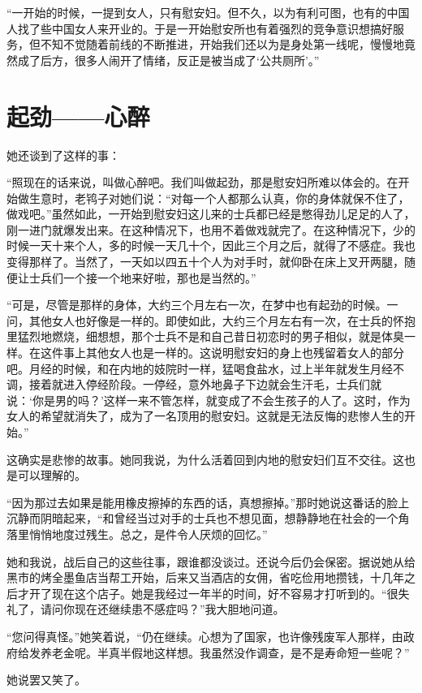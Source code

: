 \documentclass[12pt,UTF8]{ctexbook}
\begin{document}
“一开始的时候，一提到女人，只有慰安妇。但不久，以为有利可图，也有的中国人找了些中国女人来开业的。于是一开始慰安所也有着强烈的竞争意识想搞好服务，但不知不觉随着前线的不断推进，开始我们还以为是身处第一线呢，慢慢地竟然成了后方，很多人闹开了情绪，反正是被当成了‘公共厕所’。”

\section{起劲——心醉}

她还谈到了这样的事：

“照现在的话来说，叫做心醉吧。我们叫做起劲，那是慰安妇所难以体会的。在开始做生意时，老鸨子对她们说：“对每一个人都那么认真，你的身体就保不住了，做戏吧。”虽然如此，一开始到慰安妇这儿来的士兵都已经是憋得劲儿足足的人了，刚一进门就爆发出来。在这种情况下，也用不着做戏就完了。在这种情况下，少的时候一天十来个人，多的时候一天几十个，因此三个月之后，就得了不感症。我也变得那样了。当然了，一天如以四五十个人为对手时，就仰卧在床上叉开两腿，随便让士兵们一个接一个地来好啦，那也是当然的。”

“可是，尽管是那样的身体，大约三个月左右一次，在梦中也有起劲的时候。一问，其他女人也好像是一样的。即使如此，大约三个月左右有一次，在士兵的怀抱里猛烈地燃烧，细想想，那个士兵不是和自己昔日初恋时的男子相似，就是体臭一样。在这件事上其他女人也是一样的。这说明慰安妇的身上也残留着女人的部分吧。月经的时候，和在内地的妓院时一样，猛喝食盐水，过上半年就发生月经不调，接着就进入停经阶段。一停经，意外地鼻子下边就会生汗毛，士兵们就说：‘你是男的吗？’这样一来不管怎样，就变成了不会生孩子的人了。这时，作为女人的希望就消失了，成为了一名顶用的慰安妇。这就是无法反悔的悲惨人生的开始。”

这确实是悲惨的故事。她同我说，为什么活着回到内地的慰安妇们互不交往。这也是可以理解的。

“因为那过去如果是能用橡皮擦掉的东西的话，真想擦掉。”那时她说这番话的脸上沉静而阴暗起来，“和曾经当过对手的士兵也不想见面，想静静地在社会的一个角落里悄悄地度过残生。总之，是件令人厌烦的回忆。”

她和我说，战后自己的这些往事，跟谁都没谈过。还说今后仍会保密。据说她从给黑市的烤全墨鱼店当帮工开始，后来又当酒店的女佣，省吃俭用地攒钱，十几年之后才开了现在这个店子。她是我经过一年半的时间，好不容易才打听到的。“很失礼了，请问你现在还继续患不感症吗？”我大胆地问道。

“您问得真怪。”她笑着说，“仍在继续。心想为了国家，也许像残废军人那样，由政府给发养老金呢。半真半假地这样想。我虽然没作调查，是不是寿命短一些呢？”

她说罢又笑了。
\end{document}
